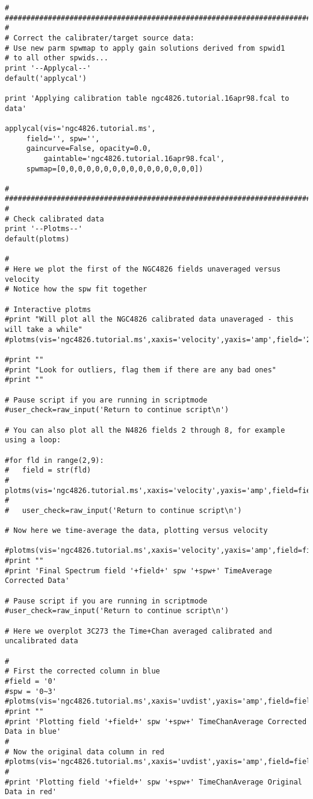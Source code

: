 \begin{verbatim}
#
##########################################################################
#
# Correct the calibrater/target source data:
# Use new parm spwmap to apply gain solutions derived from spwid1
# to all other spwids... 
print '--Applycal--'
default('applycal')

print 'Applying calibration table ngc4826.tutorial.16apr98.fcal to data'

applycal(vis='ngc4826.tutorial.ms',
	 field='', spw='',
	 gaincurve=False, opacity=0.0, 
         gaintable='ngc4826.tutorial.16apr98.fcal',
	 spwmap=[0,0,0,0,0,0,0,0,0,0,0,0,0,0,0,0])

#
##########################################################################
#
# Check calibrated data
print '--Plotms--'
default(plotms)

#
# Here we plot the first of the NGC4826 fields unaveraged versus velocity
# Notice how the spw fit together

# Interactive plotms
#print "Will plot all the NGC4826 calibrated data unaveraged - this will take a while"
#plotms(vis='ngc4826.tutorial.ms',xaxis='velocity',yaxis='amp',field='2~8',spw='12~15',averagedata=T,ydatacolumn='corrected')

#print ""
#print "Look for outliers, flag them if there are any bad ones"
#print ""
	
# Pause script if you are running in scriptmode
#user_check=raw_input('Return to continue script\n')

# You can also plot all the N4826 fields 2 through 8, for example using a loop:

#for fld in range(2,9):
#	field = str(fld)
#	plotms(vis='ngc4826.tutorial.ms',xaxis='velocity',yaxis='amp',field=field,spw='11~15',averagedata=T,ydatacolumn='corrected')
#	
#	user_check=raw_input('Return to continue script\n')

# Now here we time-average the data, plotting versus velocity

#plotms(vis='ngc4826.tutorial.ms',xaxis='velocity',yaxis='amp',field=field,spw=spw,averagedata=T,ydatacolumn='corrected',avgtime='1e7',avgscan=True)
#print ""
#print 'Final Spectrum field '+field+' spw '+spw+' TimeAverage Corrected Data'
	
# Pause script if you are running in scriptmode
#user_check=raw_input('Return to continue script\n')

# Here we overplot 3C273 the Time+Chan averaged calibrated and uncalibrated data

#
# First the corrected column in blue
#field = '0'
#spw = '0~3'
#plotms(vis='ngc4826.tutorial.ms',xaxis='uvdist',yaxis='amp',field=field,spw=spw,averagedata=T,avgchannel='1000',ydatacolumn='corrected',avgtime='1e7',avgscan=Truew)
#print ""
#print 'Plotting field '+field+' spw '+spw+' TimeChanAverage Corrected Data in blue'
#
# Now the original data column in red
#plotms(vis='ngc4826.tutorial.ms',xaxis='uvdist',yaxis='amp',field=field,spw=spw,averagdata=T,avgchannel='1000',ydatacolumn='data',avgtime='1e7',avgscan=True)
#
#print 'Plotting field '+field+' spw '+spw+' TimeChanAverage Original Data in red'
	

\end{verbatim}
